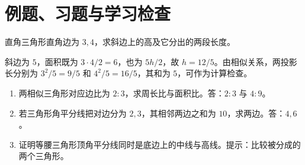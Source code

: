 \section{例题、习题与学习检查}
\begin{example}
直角三角形直角边为 $3,4$，求斜边上的高及它分出的两段长度。
\end{example}
\begin{solve}
斜边为 $5$，面积既为 $3\cdot4/2=6$，也为 $5h/2$，故 $h=12/5$。由相似关系，两投影长分别为 $3^2/5=9/5$ 和 $4^2/5=16/5$，其和为 $5$，可作为计算检查。
\end{solve}
\begin{enumerate}
\item 两相似三角形对应边比为 $2:3$，求周长比与面积比。答：$2:3$ 与 $4:9$。
\item 若三角形角平分线把对边分为 $2,3$，其相邻两边之和为 $10$，求两边。答：$4,6$。
\item 证明等腰三角形顶角平分线同时是底边上的中线与高线。提示：比较被分成的两个三角形。
\end{enumerate}

